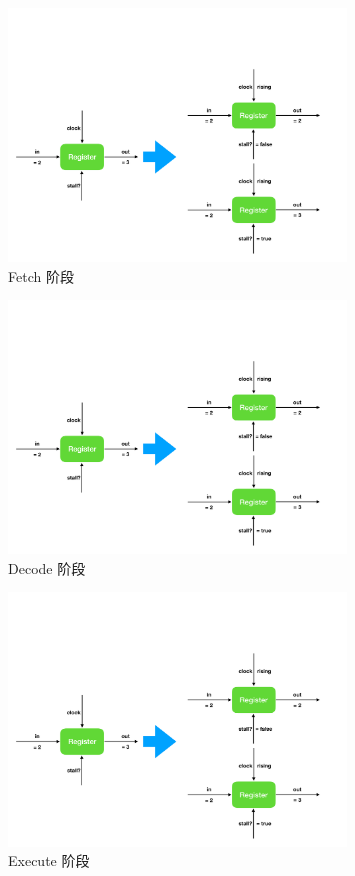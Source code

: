 \documentclass[12pt]{article}
\begin{document}
    \begin{figure}
        \centering
        \includegraphics[page=2,width=0.8\textwidth]{design.pdf}
        \caption{Fetch 阶段}
        \label{fig:simulator-design-fetch}
    \end{figure}
    \begin{figure}
        \centering
        \includegraphics[page=3,width=0.8\textwidth]{design.pdf}
        \caption{Decode 阶段}
        \label{fig:simulator-design-decode}
    \end{figure}
    \begin{figure}
        \centering
        \includegraphics[page=4,width=0.8\textwidth]{design.pdf}
        \caption{Execute 阶段}
        \label{fig:simulator-design-execute}
    \end{figure}
\end{document}
